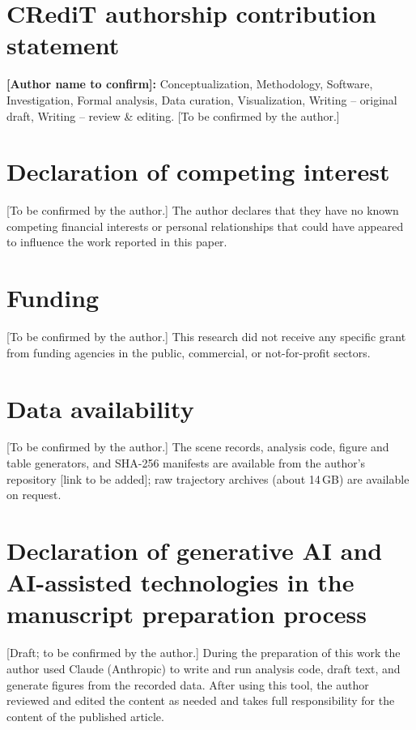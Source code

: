 \section*{CRediT authorship contribution statement}
\textbf{[Author name to confirm]:} Conceptualization, Methodology, Software, Investigation, Formal analysis, Data curation, Visualization, Writing -- original draft, Writing -- review \& editing. [To be confirmed by the author.]

\section*{Declaration of competing interest}
[To be confirmed by the author.] The author declares that they have no known competing financial interests or personal relationships that could have appeared to influence the work reported in this paper.

\section*{Funding}
[To be confirmed by the author.] This research did not receive any specific grant from funding agencies in the public, commercial, or not-for-profit sectors.

\section*{Data availability}
[To be confirmed by the author.] The scene records, analysis code, figure and table generators, and SHA-256 manifests are available from the author's repository [link to be added]; raw trajectory archives (about 14\,GB) are available on request.

\section*{Declaration of generative AI and AI-assisted technologies in the manuscript preparation process}
[Draft; to be confirmed by the author.] During the preparation of this work the author used Claude (Anthropic) to write and run analysis code, draft text, and generate figures from the recorded data. After using this tool, the author reviewed and edited the content as needed and takes full responsibility for the content of the published article.

